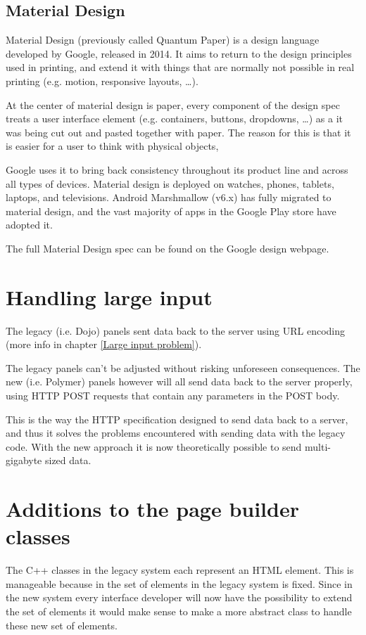 \subsection{Material Design}
\label{Material Design}
Material Design (previously called Quantum Paper) is a design language developed
by Google\cite{materialdesign_launch}, released in 2014. It aims to return to the design principles used
in printing, and extend it with things that are normally not possible in real
printing (e.g. motion, responsive layouts, \ldots).

At the center of material design is paper, every component of the design spec
treats a user interface element (e.g. containers, buttons, dropdowns, \ldots) as
a it was being cut out and pasted together with paper.
The reason for this is that it is easier for a user to think with physical objects,

Google uses it to bring back consistency throughout its product line and across
all types of devices. Material design is deployed on watches, phones, tablets,
laptops, and televisions.
Android Marshmallow (v6.x) has fully migrated to material design, and the vast
majority of apps in the Google Play store have adopted it.

The full Material Design spec can be found on the Google design webpage\cite{materialdesign}.

\section{Handling large input}
The legacy (i.e. Dojo) panels sent data back to the server using URL encoding
(more info in chapter \ref{Large input problem}).

The legacy panels can't be adjusted without risking unforeseen consequences.
The new (i.e. Polymer) panels however will all send data back to the server
properly, using HTTP POST requests that contain any parameters in the POST body.

This is the way the HTTP specification designed to send data back to a server,
and thus it solves the problems encountered with sending data with the
legacy code. With the new approach it is now theoretically possible to send 
multi-gigabyte sized data.

\section{Additions to the page builder classes}
The C++ classes in the legacy system each represent an HTML element.
This is manageable because in the set of elements in the legacy system is fixed.
Since in the new system every interface developer will now have the possibility to extend the set of
elements it would make sense to make a more abstract class to handle these new
set of elements.

